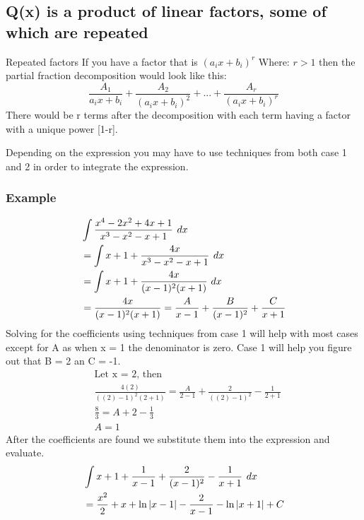\documentclass[letterpaper,10pt,twoside,twocolumn,openany]{book}
\begin{document}
\subsection{Q(x) is a product of linear factors, some of which are repeated}
\begin{DndSidebar}{Repeated factors}
    If you have a factor that is $(a_ix + b_i)^r$ Where: $ r > 1$ then the partial fraction decomposition would look like this:
    \begin{equation}
        \frac{A_1}{a_ix+b_i} + \frac{A_2}{(a_ix+b_i)^2} + ... + \frac{A_r}{(a_ix+b_i)^r}
    \end{equation}
    There would be r terms after the decomposition with each term having a factor with a unique power [1-r]. 
\end{DndSidebar}
Depending on the expression you may have to use techniques from both case 1 and 2 in order to integrate the expression.

\subsubsection{Example}
\begin{align*}    
    &\large\int \frac{x^4 - 2x^2 + 4x + 1}{x^3 - x^2 - x + 1}\ dx\\
    &=\large\int x + 1 + \frac{4x}{x^3 - x^2 - x + 1}\ dx\\ 
    &=\int x + 1 + \frac{4x}{(x - 1)^2 (x+1)}\ dx\\
    &=\frac{4x}{(x - 1)^2 (x+1)} = \frac{A}{x-1} + \frac{B}{(x - 1)^2} + \frac{C}{x + 1}
\end{align*}
Solving for the coefficients using techniques from case 1 will help with most cases except for A as when x = 1 the denominator is zero. Case 1 will help you figure out that B = 2 an C = -1.
\begin{align*}
    &\text{Let x = 2, then}\\
    &\frac{4(2)}{((2)-1)^2(2+1)} = \frac{A}{2 - 1} + \frac{2}{((2)-1)^2} - \frac{1}{2+1}\\
    &\frac{8}{3} = A + 2 - \frac{1}{3}\\
    &A = 1 
\end{align*}
After the coefficients are found we substitute them into the expression and evaluate.
$$\begin{aligned}
    &\large\int x + 1 +  \frac{1}{x-1} + \frac{2}{(x - 1)^2} - \frac{1}{x + 1}\ dx\\
    &= \frac{x^2}{2} + x + \ln{|x-1|} - \frac{2}{x-1} - \ln{|x + 1|} + C
\end{aligned}$$
\newpage
\end{document}
